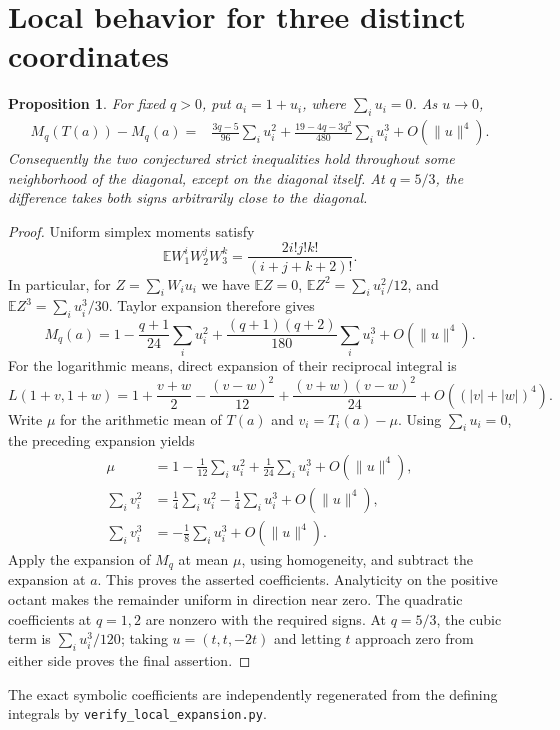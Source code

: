\documentclass[11pt]{article}
\newtheorem{proposition}{Proposition}
\begin{document}
\section{Local behavior for three distinct coordinates}
\begin{proposition}
For fixed $q>0$, put $a_i=1+u_i$, where $\sum_i u_i=0$. As $u\to0$,
\begin{align*}
 M_q(T(a))-M_q(a)
 ={}&\frac{3q-5}{96}\sum_i u_i^2
 +\frac{19-4q-3q^2}{480}\sum_i u_i^3
 +O(\lVert u\rVert^4).
\end{align*}
Consequently the two conjectured strict inequalities hold throughout
some neighborhood of the diagonal, except on the diagonal itself.
At $q=5/3$, the difference takes both signs arbitrarily close to the diagonal.
\end{proposition}
\begin{proof}
Uniform simplex moments satisfy
\[
 \mathbb E W_1^iW_2^jW_3^k=\frac{2i!j!k!}{(i+j+k+2)!}.
\]
In particular, for $Z=\sum_iW_i u_i$ we have
$\mathbb EZ=0$, $\mathbb EZ^2=\sum_i u_i^2/12$, and
$\mathbb EZ^3=\sum_i u_i^3/30$. Taylor expansion therefore gives
\[
 M_q(a)=1-\frac{q+1}{24}\sum_i u_i^2
 +\frac{(q+1)(q+2)}{180}\sum_i u_i^3+O(\lVert u\rVert^4).
\]
For the logarithmic means, direct expansion of their reciprocal integral is
\[
 L(1+v,1+w)=1+\frac{v+w}{2}-\frac{(v-w)^2}{12}
 +\frac{(v+w)(v-w)^2}{24}+O((|v|+|w|)^4).
\]
Write $\mu$ for the arithmetic mean of $T(a)$ and $v_i=T_i(a)-\mu$.
Using $\sum_i u_i=0$, the preceding expansion yields
\begin{align*}
 \mu&=1-\frac1{12}\sum_i u_i^2+\frac1{24}\sum_i u_i^3
 +O(\lVert u\rVert^4),\\
 \sum_i v_i^2&=\frac14\sum_i u_i^2-\frac14\sum_i u_i^3
 +O(\lVert u\rVert^4),\\
 \sum_i v_i^3&=-\frac18\sum_i u_i^3+O(\lVert u\rVert^4).
\end{align*}
Apply the expansion of $M_q$ at mean $\mu$, using homogeneity, and subtract
the expansion at $a$. This proves the asserted coefficients. Analyticity
on the positive octant makes the remainder uniform in direction near zero.
The quadratic coefficients at $q=1,2$ are nonzero with the required signs.
At $q=5/3$, the cubic term is $\sum_i u_i^3/120$; taking
$u=(t,t,-2t)$ and letting $t$ approach zero from either side proves
the final assertion.
\end{proof}
The exact symbolic coefficients are independently regenerated from the
defining integrals by \texttt{verify\_local\_expansion.py}.
\end{document}
